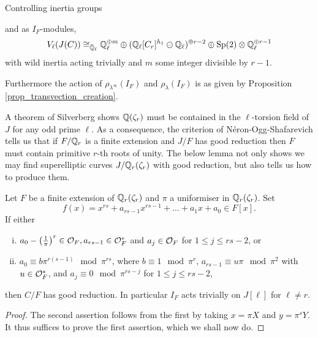 \documentclass[11pt,a4paper]{article}
\newcommand{\Qr}{{\QQ(\zeta_r)}}
\newcommand{\zr}{\zeta_r}
\begin{document}
\begin{section}{Controlling inertia groups}
\begin{example}
\begin{center}
\end{center}
and as $I_F$-modules, \[V_\ell(J(C)) \cong_{\Bar{\mathbb{Q}}_\ell}\mathbb{Q}_\ell^{\oplus m} \oplus (\mathbb{Q}_\ell[C_{r}]^{h_1}  \ominus \mathbb{Q}_\ell)^{\oplus r-2} \oplus \mathrm{Sp}(2) \otimes \mathbb{Q}_\ell^{\oplus r-1}\]
with wild inertia acting trivially and $m$ some integer divisible by $r-1$. 

Furthermore the action of $\rho_{\lambda^\infty}(I_F)$ and $\rho_{\lambda}(I_F)$ is as given by Proposition \ref{prop_transvection_creation}.
\end{example}



A theorem of Silverberg \cite[Thm 4.1]{Silverberg} shows $\Qr$ must be contained in the $\ell$-torsion field of $J$ for any odd prime $\ell$. As a consequence, the criterion of N\'eron-Ogg-Shafarevich tells us that if $F/\mathbb{Q}_r$ is a finite extension and $J/F$ has good reduction then $F$ must contain primitive $r$-th roots of unity.
The below lemma not only shows we may find superelliptic curves $J/\QQ_r(\zr)$ with good reduction, but also tells us how to produce them.

\begin{lemma}
\label{lemma_good_reduction_at_r}
Let $F$ be a finite extension of $\mathbb{Q}_r(\zeta_r)$ and $\pi$ a uniformiser in $\mathbb{Q}_r(\zeta_r)$. Set  $$f(x) = x^{rs} +a_{rs-1}x^{rs-1}+ \ldots + a_1x+a_0 \in F[x].$$
If either
\begin{enumerate}[(i)]
    \item $a_0 - \left(\frac{1}{\pi}\right)^r \in \mathcal{O}_F, a_{rs-1} \in \mathcal{O}^*_F$ and $a_j \in \mathcal{O}_F$ for $1\leq j \leq rs-2 $, or
    \item $a_0\equiv b \pi^{r(s-1)} \mod{\pi^{rs}}$, where $b \equiv 1 \mod{\pi^r}$, $a_{rs-1} \equiv u\pi\mod{\pi^2}$ with $u \in \mathcal{O}_F^*$, and $a_{j} \equiv 0\mod{\pi^{rs-j}} $ for $1\leq j \leq rs-2 $,
\end{enumerate}
then $C/F$ has good reduction. In particular $I_F$ acts trivially on $J[\ell]$ for $\ell \neq r$.
\end{lemma}

\begin{proof}
The second assertion follows from the first by taking $x = \pi X$ and $y = \pi^s Y$.
It thus suffices to prove the first assertion, which we shall now do.


\end{proof}
\end{section}
\end{document}

